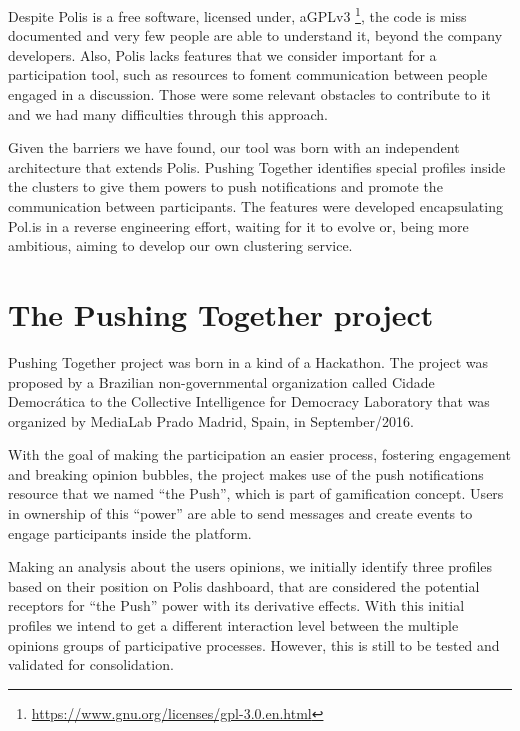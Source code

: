 \documentclass{llncs}
\begin{document}
  Despite Polis is a free software, licensed under,
aGPLv3 \footnote{\url{https://www.gnu.org/licenses/gpl-3.0.en.html}},
the code is miss documented and
very few people are able to understand it, beyond the company developers. Also,
Polis lacks features that we consider important for a participation tool, such
as resources to foment communication between people engaged in a discussion. 
Those were some relevant obstacles to contribute to it and we had many 
difficulties through this approach.

Given the barriers we have found, our tool was born with an independent
architecture that extends Polis.
Pushing Together identifies special profiles inside the clusters to give them
powers to push notifications and promote the communication between participants.
The features were developed encapsulating Pol.is in a reverse engineering effort,
waiting for it to evolve or, being more ambitious, aiming to develop our own clustering service.

\section{The Pushing Together project}
\label{sec:pushingtogether}

  Pushing Together project was born in a kind of a Hackathon. The project was
proposed by a Brazilian non-governmental organization called Cidade Democr\'atica
to the Collective Intelligence for Democracy Laboratory that was organized by
MediaLab Prado Madrid, Spain, in September/2016.

  With the goal of making the participation an easier process, fostering
engagement and breaking opinion bubbles, the project makes use of the
push notifications resource that we named ``the Push'', which is part of gamification
concept. Users in ownership of this ``power'' are able to send
messages and create events to engage participants inside the platform.

 Making an analysis about the users opinions, we initially identify three
 profiles based on their position on Polis dashboard, that are considered the potential
 receptors for ``the Push'' power with its derivative effects. With this
 initial profiles we intend to get a different interaction level between
 the multiple opinions groups of participative processes. However, this is still
 to be tested and validated for consolidation.
\end{document}

